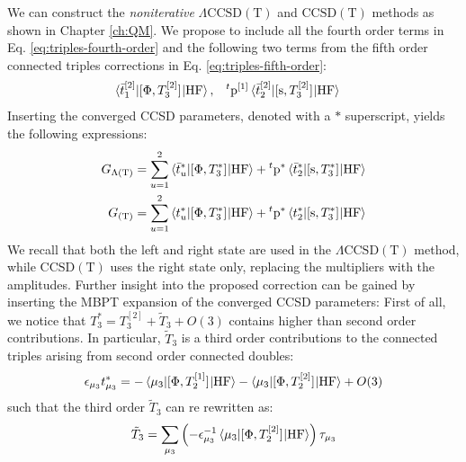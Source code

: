 We can construct the \emph{noniterative}
$\Lambda\text{CCSD}(\text{T})$\autocite{Kucharski1998-qq,
Kucharski1998-oi, Crawford1998-vj} and
$\text{CCSD}(\text{T})$\autocite{Raghavachari1989-bn} methods as shown
in Chapter \ref{ch:QM}.
We propose to include all the fourth order terms in Eq.
\eqref{eq:triples-fourth-order} and the following two terms from the
fifth order connected triples corrections in Eq.
\eqref{eq:triples-fifth-order}:
\begin{alignat}{2}
 \braket{\bar{t}_{1}^{[2]} | [ \Phi, T_3^{[2]} ]^{} | \mathrm{HF}},
    \quad&
 {}^t\mathrm{p}^{[1]}\braket{\bar{t}_{2}^{[2]} | [ \mathrm{s}, T_3^{[2]} ]^{} | \mathrm{HF}}
\end{alignat}
Inserting the converged \acrshort{CCSD} parameters, denoted with a $*$
superscript, yields the following expressions:
\begin{subequations}\label{eq:g-parentheses-t}
 \begin{align}
  G_{\Lambda(\text{T})}
  &=
    \sum_{u=1}^2\braket{\bar{t}_{u}^{*}| [ \Phi, T_3^{*} ]^{} | \mathrm{HF}}
    + {}^t\mathrm{p}^{*}\braket{\bar{t}_{2}^{*} | [ \mathrm{s}, T_3^{*} ]^{} | \mathrm{HF}} \\
  G_{(\text{T})}
 &=
    \sum_{u=1}^2\braket{t_{u}^{*}|[ \Phi, T_3^{*} ]^{} | \mathrm{HF}}
    + {}^t\mathrm{p}^{*}\braket{t_{2}^{*} | [ \mathrm{s}, T_3^{*} ]^{} | \mathrm{HF}}
 \end{align}
\end{subequations}
We recall that both the left and right state are used in the
$\Lambda\text{CCSD}(\text{T})$ method, while $\text{CCSD}(\text{T})$
uses the right state only, replacing the multipliers with the
amplitudes.
Further insight into the proposed correction can be gained by
inserting the \acrshort{MBPT} expansion of the converged \acrshort{CCSD}
parameters:\autocite{Stanton1997-lx, Koch1997-nm,
Eriksen2014-gy, Eriksen2015-il, Kristensen2016-od}
First of all, we notice that $T_3^{*} = T_3^{[2]} + \tilde{T}_3 + O(3)$
contains higher than second order contributions. In particular, $\tilde{T}_3$
is a third order contributions to the connected triples arising from
second order connected doubles:
\begin{equation}
  \epsilon_{\mu_3}t_{\mu_3}^{*} =
  - \braket{\mu_3 |[ \Phi, T_2^{[1]} ]^{} | \mathrm{HF}}
  - \braket{\mu_3 | [ \Phi, T_2^{[2]} ]^{} | \mathrm{HF}}
  + O(3)
\end{equation}
such that the third order $\tilde{T}_3$ can re rewritten as:
\begin{equation}
  \tilde{T}_3
  = \sum_{\mu_3}
  \left(-\epsilon_{\mu_3}^{-1}\braket{\mu_3 |
  [ \Phi, T_2^{[2]} ]^{}
  | \mathrm{HF}}\right)
  \tau_{\mu_3}
\end{equation}

